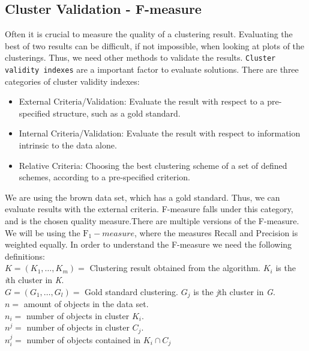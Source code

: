 \documentclass[a4paper,10pt]{article}
\theoremstyle{plain}
\theoremstyle{definition}
\begin{document}
\subsection{Cluster Validation - F-measure}
Often it is crucial to measure the quality of a clustering result. Evaluating the best of two results can be difficult, if not impossible, when looking at plots of the clusterings. Thus, we need other methods to validate the results. \texttt{Cluster validity indexes} are a important factor to evaluate solutions. There are three categories of cluster validity indexes:
\begin{itemize}
	\item External Criteria/Validation: Evaluate the result with respect to a pre-specified structure, such as a gold standard. 
	\item Internal Criteria/Validation: Evaluate the result with respect to information intrinsic to the data alone.
	\item Relative Criteria: Choosing the best clustering scheme of a set of defined schemes, according to a pre-specified criterion.
\end{itemize}
We are using the brown data set, which has a gold standard. Thus, we can evaluate results with the external criteria. F-measure falls under this category, and is the chosen quality measure.There are multiple versions of the F-measure. We will be using the $\text{F}_1-measure$, where the measures Recall and Precision is weighted equally. In order to understand the F-measure we need the following definitions:\\
$K = (K_1, \dots, K_m) = $ Clustering result obtained from the algorithm. $K_i$ is the \textit{i}th cluster in \textit{K}.\\
$G = (G_1, \dots, G_l) = $ Gold standard clustering. $G_j$ is the \textit{j}th cluster in \textit{G}.\\
$n = $ amount of objects in the data set. \\
$n_i = $ number of objects in cluster $K_i$. \\
$n^j = $ number of objects in cluster $C_j$. \\
$n_{i}^{j} = $ number of objects contained in $K_i \cap C_j$
\end{document}
